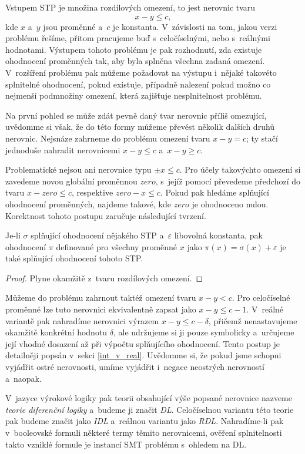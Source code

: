 Vstupem STP je množina rozdílových omezení, to jest nerovnic tvaru $$x - y \leq c,$$ kde $x$ a~$y$ jsou proměnné a~$c$ je konstanta. V~závislosti na tom, jakou verzi problému řešíme, přitom pracujeme buď s~celočíselnými, nebo s~reálnými hodnotami. Výstupem tohoto problému je pak rozhodnutí, zda existuje ohodnocení proměnných tak, aby byla splněna všechna zadaná omezení. V~rozšíření problému pak můžeme požadovat na výstupu i~nějaké takovéto splnitelné ohodnocení, pokud existuje, případně nalezení pokud možno co nejmenší podmnožiny omezení, která zajišťuje nesplnitelnost problému.

Na první pohled se může zdát pevně daný tvar nerovnic příliš omezující, uvědomme si však, že do této formy můžeme převést několik dalších druhů nerovnic. Nejsnáze zahrneme do problému omezení tvaru $x - y = c$; ty stačí jednoduše nahradit nerovnicemi $x - y \leq c$ a~$x - y \geq c$.

Problematické nejsou ani nerovnice typu $\pm x \leq c$. Pro účely takovýchto omezení si zavedeme novou globální proměnnou $zero$, s~jejíž pomocí převedeme předchozí do tvaru $x - zero \leq c$, respektive $zero - x \leq c$. Pokud pak hledáme splňující ohodnocení proměnných, najdeme takové, kde $zero$ je ohodnoceno nulou. Korektnost tohoto postupu zaručuje následující tvrzení.

\begin{lemma}
	Je-li $\sigma$ splňující ohodnocení nějakého STP a~$\varepsilon$ libovolná konstanta, pak ohodnocení $\pi$ definované pro všechny proměnné $x$ jako $\pi(x) = \sigma(x) + \varepsilon$ je také splňující ohodnocení tohoto STP.
\end{lemma}
\begin{proof}
	Plyne okamžitě z~tvaru rozdílových omezení.
\end{proof}

Můžeme do problému zahrnout taktéž omezení tvaru $x - y < c$. Pro celočíselné proměnné lze tuto nerovnici ekvivalentně zapsat jako $x - y \leq c-1$. V~reálné variantě pak nahradíme nerovnici výrazem $x - y \leq c - \delta$, přičemž nenastavujeme okamžitě konkrétní hodnotu $\delta$, ale udržujeme si ji pouze symbolicky a~určujeme její vhodné dosazení až při výpočtu splňujícího ohodnocení. Tento postup je detailněji popsán v~sekci \ref{int_v_real}. Uvědomme si, že pokud jsme schopni vyjádřit ostré nerovnosti, umíme vyjádřit i~negace neostrých nerovností a~naopak.

V~jazyce výrokové logiky pak teorii obsahující výše popsané nerovnice nazveme \emph{teorie diferenční logiky} a~budeme ji značit \emph{DL}. Celočíselnou variantu této teorie pak budeme značit jako \emph{IDL} a~reálnou variantu jako \emph{RDL}. Nahradíme-li pak v~booleovské formuli některé termy těmito nerovnicemi, ověření splnitelnosti takto vzniklé formule je instancí SMT problému s~ohledem na DL.



